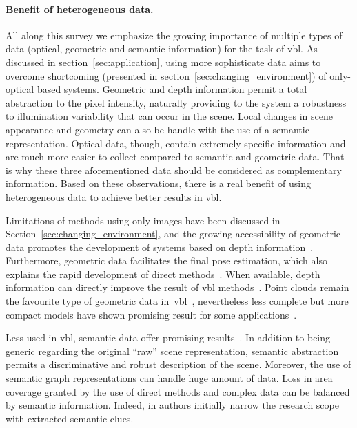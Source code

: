      	\paragraph{Benefit of heterogeneous data.}
	     	All along this survey we emphasize the growing importance of multiple types of data (optical, geometric and semantic information) for the task of \ac{vbl}. As discussed in section~\ref{sec:application}, using more sophisticate data aims to overcome shortcoming (presented in section~\ref{sec:changing_environment}) of only-optical based systems. Geometric and depth information permit a total abstraction to the pixel intensity, naturally providing to the system a robustness to illumination variability that can occur in the scene. Local changes in scene appearance and geometry can also be handle with the use of a semantic representation. Optical data, though, contain extremely specific information and are much more easier to collect compared to semantic and geometric data. That is why these three aforementioned data should be considered as complementary information. Based on these observations, there is a real benefit of using heterogeneous data to achieve better results in \ac{vbl}.
	     	
	     	Limitations of methods using only images have been discussed in Section~\ref{sec:changing_environment}, and the growing accessibility of geometric data promotes the development of systems based on depth information~\citep{Paparoditis2012}. Furthermore, geometric data facilitates the final pose estimation, which also explains the rapid development of direct methods~\citep{Kroeger2014,Pani2015Lmi,Pani2015Robust}. When available, depth information can directly improve the result of \ac{vbl} methods~\citep{Ni2009,Gee2012,Shotton2013,Torii2015,Cavallari}. Point clouds remain the favourite type of geometric data in~\ac{vbl}~\citep{Sattler2016a}, nevertheless less complete but more compact models have shown promising result for some applications~\citep{Ramalingam2010,Bansal2014,Christie2016,Torii2015}.
	     	
	     	Less used in \ac{vbl}, semantic data offer promising results~\citep{Ardeshir2014,Castaldo2015,Christie2016}. In addition to being generic regarding the original ``raw'' scene representation, semantic abstraction permits a discriminative and robust description of the scene. Moreover, the use of semantic graph representations can handle huge amount of data. Loss in area coverage granted by the use of direct methods and complex data can be balanced by semantic information. Indeed, in \citep{Ardeshir2014,Lu2015} authors initially narrow the research scope with extracted semantic clues.
     
